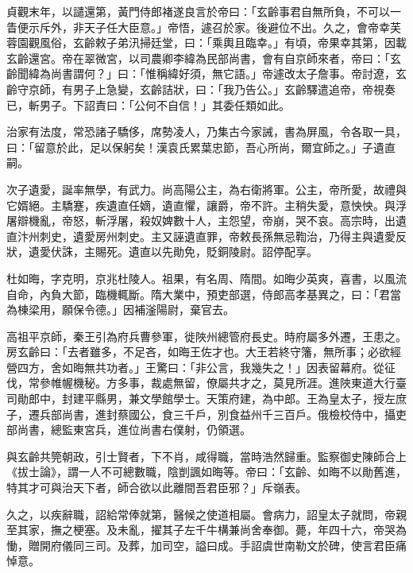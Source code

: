 \begin{pinyinscope}
 貞觀末年，以譴還第，黃門侍郎褚遂良言於帝曰：「玄齡事君自無所負，不可以一眚便示斥外，非天子任大臣意。」帝悟，遽召於家。後避位不出。久之，會帝幸芙蓉園觀風俗，玄齡敕子弟汛掃廷堂，曰：「乘輿且臨幸。」有頃，帝果幸其第，因載玄齡還宮。帝在翠微宮，以司農卿李緯為民部尚書，會有自京師來者，帝曰：「玄齡聞緯為尚書謂何？」曰：「惟稱緯好須，無它語。」帝遽改太子詹事。帝討遼，玄齡守京師，有男子上急變，玄齡詰狀，曰：「我乃告公。」玄齡驛遣追帝，帝視奏已，斬男子。下詔責曰：「公何不自信！」其委任類如此。



 治家有法度，常恐諸子驕侈，席勢凌人，乃集古今家誡，書為屏風，令各取一具，曰：「留意於此，足以保躬矣！漢袁氏累葉忠節，吾心所尚，爾宜師之。」子遺直嗣。



 次子遺愛，誕率無學，有武力。尚高陽公主，為右衛將軍。公主，帝所愛，故禮與它婿絕。主驕蹇，疾遺直任嫡，遺直懼，讓爵，帝不許。主稍失愛，意怏怏。與浮屠辯機亂，帝怒，斬浮屠，殺奴婢數十人，主怨望，帝崩，哭不哀。高宗時，出遺直汴州刺史，遺愛房州刺史。主又誣遺直罪，帝敕長孫無忌鞫治，乃得主與遺愛反狀，遺愛伏誅，主賜死。遺直以先勛免，貶銅陵尉。詔停配享。



 杜如晦，字克明，京兆杜陵人。祖果，有名周、隋間。如晦少英爽，喜書，以風流自命，內負大節，臨機輒斷。隋大業中，預吏部選，侍郎高孝基異之，曰：「君當為棟梁用，願保令德。」因補滏陽尉，棄官去。



 高祖平京師，秦王引為府兵曹參軍，徙陜州總管府長史。時府屬多外遷，王患之。房玄齡曰：「去者雖多，不足吝，如晦王佐才也。大王若終守籓，無所事；必欲經營四方，舍如晦無共功者。」王驚曰：「非公言，我幾失之！」因表留幕府。從征伐，常參帷幄機秘。方多事，裁處無留，僚屬共才之，莫見所涯。進陜東道大行臺司勛郎中，封建平縣男，兼文學館學士。天策府建，為中郎。王為皇太子，授左庶子，遷兵部尚書，進封蔡國公，食三千戶，別食益州千三百戶。俄檢校侍中，攝吏部尚書，總監東宮兵，進位尚書右僕射，仍領選。



 與玄齡共筦朝政，引士賢者，下不肖，咸得職，當時浩然歸重。監察御史陳師合上《拔士論》，謂一人不可總數職，陰剴諷如晦等。帝曰：「玄齡、如晦不以勛舊進，特其才可與治天下者，師合欲以此離間吾君臣邪？」斥嶺表。



 久之，以疾辭職，詔給常俸就第，醫候之使道相屬。會病力，詔皇太子就問，帝親至其家，撫之梗塞。及未亂，擢其子左千牛構兼尚舍奉御。薨，年四十六，帝哭為慟，贈開府儀同三司。及葬，加司空，謚曰成。手詔虞世南勒文於碑，使言君臣痛悼意。




\end{pinyinscope}

